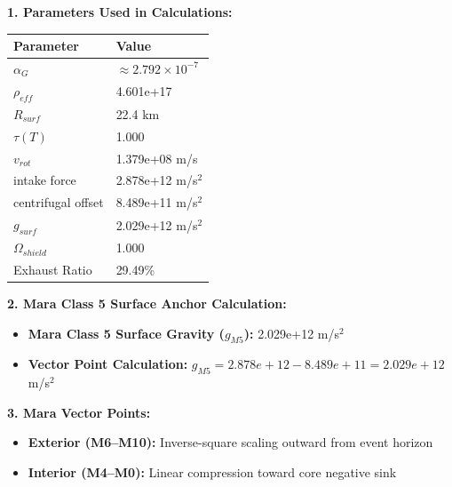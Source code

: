 \documentclass[11pt, a4paper]{article}
\begin{document}
\vspace{0.5em}
\noindent \textbf{1. Parameters Used in Calculations:}
\begin{center}
  \begin{tabular}{|l|l|}
    \hline
    \textbf{Parameter} & \textbf{Value} \\ \hline
    $\alpha_G$ & $\approx 2.792 \times 10^{-7}$ \\ \hline
    $\rho_{eff}$ & 4.601e+17 \\ \hline
    $R_{surf}$ & 22.4 km \\ \hline
    $\tau(T)$ & 1.000 \\ \hline
    $v_{rot}$ & 1.379e+08 m/s \\ \hline
    intake force & 2.878e+12 m/s$^2$ \\ \hline
    centrifugal offset & 8.489e+11 m/s$^2$ \\ \hline
    $g_{surf}$ & 2.029e+12 m/s$^2$ \\ \hline
    $\Omega_{shield}$ & 1.000 \\ \hline
    Exhaust Ratio & 29.49\% \\ \hline
  \end{tabular}
\end{center}

\vspace{0.5em}
\noindent \textbf{2. Mara Class 5 Surface Anchor Calculation:}
\begin{itemize}
  \item \textbf{Mara Class 5 Surface Gravity ($g_{M5}$):} 2.029e+12 m/s$^2$
  \item \textbf{Vector Point Calculation:} $g_{M5} = 2.878e+12 - 8.489e+11 = 2.029e+12$ m/s$^2$
\end{itemize}

\vspace{0.5em}
\noindent \textbf{3. Mara Vector Points:}
\begin{itemize}
  \item \textbf{Exterior (M6--M10):} Inverse-square scaling outward from event horizon
  \item \textbf{Interior (M4--M0):} Linear compression toward core negative sink
\end{itemize}
\end{document}
